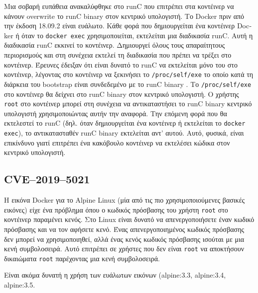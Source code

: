 Mια σοβαρή ευπάθεια ανακαλύφθηκε στο \textlatin{runC} που επιτρέπει στα
κοντέινερ να κάνουν \textlatin{overwrite} το \textlatin{runC binary} στον
κεντρικό υπολογιστή. Το \textlatin{Docker} πριν από την έκδοση 18.09.2 είναι
ευάλωτο. Κάθε φορά που δημιουργείται ένα κοντέινερ \textlatin{Docker} ή όταν το
\texttt{\textlatin{docker exec}} χρησιμοποιείται, εκτελείται μια διαδικασία
\textlatin{runC}. Αυτή η διαδικασία \textlatin{runC} εκκινεί το κοντέινερ.
Δημιουργεί όλους τους απαραίτητους περιορισμούς και στη συνέχεια εκτελεί τη
διαδικασία που πρέπει να τρέξει στο κοντέινερ. Έρευνες έδειξαν ότι είναι δυνατό
το runC να εκτελείται μόνο του στο κοντέινερ, λέγοντας στο κοντέινερ να
ξεκινήσει το \texttt{\textlatin{/proc/self/exe}} το οποίο κατά τη διάρκεια του
\textlatin{bootstrap} είναι συνδεδεμένο με το \textlatin{runC binary}
\cite{CVE-2019-5736-DragonSector} \cite{CVE-2019-5736-Github}. Το
\texttt{\textlatin{/proc/self/exe}} στο κοντέινερ θα δείχνει στο \textlatin{runC
binary} στον κεντρικό υπολογιστή. Ο χρήστης \texttt{\textlatin{root}} στο
κοντέινερ μπορεί στη συνέχεια να αντικαταστήσει το \textlatin{runC binary}
κεντρικό υπολογιστή χρησιμοποιώντας αυτήν την αναφορά. Την επόμενη φορά που θα
εκτελεστεί το \textlatin{runC} (δηλ. όταν δημιουργείται ένα κοντέινερ ή
εκτελείται το \texttt{\textlatin{docker exec}}), το αντικατασταθέν
\textlatin{runC binary} εκτελείται αντ' αυτού. Αυτό, φυσικά, είναι επικίνδυνο
γιατί επιτρέπει ένα κακόβουλο κοντέινερ να εκτελέσει κώδικα στον κεντρικό
υπολογιστή.

\subsection{\textlatin{CVE–2019–5021}}

Η εικόνα \textlatin{Docker} για το \textlatin{Alpine Linux} (μία από τις πιο
χρησιμοποιούμενες βασικές εικόνες) είχε
ένα πρόβλημα όπου ο κωδικός πρόσβασης του χρήστη \texttt{\textlatin{root}} στο
κοντέινερ παραμένει κενός.
Στο \textlatin{Linux} είναι δυνατό να απενεργοποιήσετε έναν κωδικό πρόσβασης και
να τον αφήσετε κενό. Ένας απενεργοποιημένος κωδικός πρόσβασης δεν μπορεί να
χρησιμοποιηθεί, αλλά ένας κενός κωδικός πρόσβασης ισούται με μια κενή
συμβολοσειρά. Αυτό επιτρέπει σε χρήστες που δεν είναι \texttt{\textlatin{root}}
να αποκτήσουν δικαιώματα \texttt{\textlatin{root}} παρέχοντας μια κενή
συμβολοσειρά.

Είναι ακόμα δυνατή η χρήση των ευάλωτων εικόνων (\textlatin{alpine:3.3,
alpine:3.4, alpine:3.5}. \\

